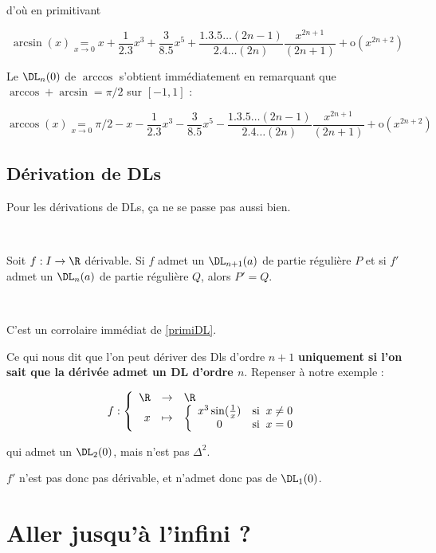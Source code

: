 \documentclass[12pt]{article}
\begin{document}
d'où en primitivant 

$$\arcsin(x) \underset{x\rightarrow 0}{=} x +\frac{1}{2.3} x^3 +
\frac{3}{8.5} x^5 +  \frac{1.3.5\dots(2n-1)}{2.4\dots(2n)} \frac{x^{2n+1}}{(2n+1)} + \text{o}(x^{2n+2})$$

Le $\DL_n(0)$ de $\arccos$ s'obtient immédiatement en remarquant que
$\arccos+\arcsin=\pi/2$ sur $[-1,1]$ :

$$\arccos(x) \underset{x\rightarrow 0}{=} \pi/2 - x -\frac{1}{2.3} x^3 -
\frac{3}{8.5} x^5 -  \frac{1.3.5\dots(2n-1)}{2.4\dots(2n)} \frac{x^{2n+1}}{(2n+1)} + \text{o}(x^{2n+2})$$


\subsection{Dérivation de DLs}

Pour les dérivations de DLs, ça ne se passe pas aussi bien.

\begin{Prop}~

  Soit $f:I\rightarrow \R$ dérivable. Si $f$ admet un $\DL_{n+1}(a)$ de
  partie régulière $P$ et si $f'$ admet un $\DL_n(a)$ de partie régulière
  $Q$, alors $P'=Q$.
  
\end{Prop}

\begin{demo}~

C'est un corrolaire immédiat de \ref{primiDL}.

\end{demo}


Ce qui nous dit que l'on peut dériver des Dls d'ordre $n+1$
  \textbf{uniquement si l'on sait que la dérivée admet un DL d'ordre
  $n$}. Repenser à notre exemple :

\[
f : \left\{
\begin{array}{rcl}
\R  & \to & \R \\
x & \mapsto & \left\{
\begin{array}{cl} 
  x^3 \sin(\frac{1}{x}) & \text{si}\;\; x\neq 0\\
  0 & \text{si}\;\; x=0 
\end{array}
\right.
\end{array}
\right.
\]

qui admet un $\DL_2(0)$, mais n'est pas $\Delta^2$.

$f'$ n'est pas donc pas dérivable, et n'admet donc pas de $\DL_1(0)$.

\section{Aller jusqu'à l'infini ?}
\end{document}
